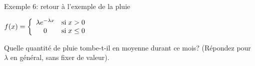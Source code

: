 \documentclass[handout]{BeamerTemplate}
\begin{document}
%
%

\begin{frame}[t]{Exemple 6: retour à l'exemple de la pluie}

 {\small $f(x)=\left\{\begin{array}{c l}\lambda e^{-\lambda x}&\text{si} \;x>0\\
 0&\text{si} \; x\leq 0
 \end{array}\right.$

\vspace{3mm}

Quelle quantité de pluie tombe-t-il en moyenne durant ce mois? (Répondez pour $\lambda$ en général, sans fixer de valeur).
}




\end{frame}







\end{document}
